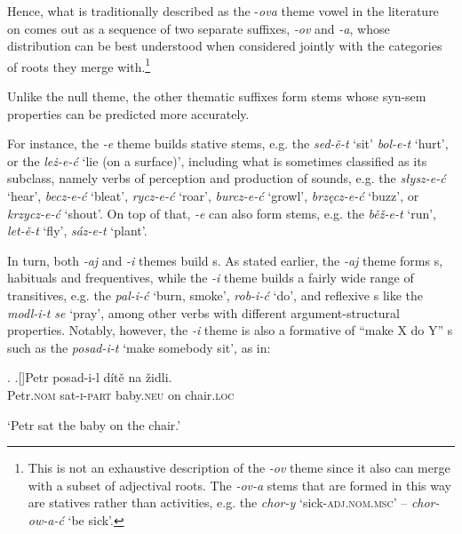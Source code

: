 Hence, what is traditionally described as the -\textit{ova} theme vowel in the literature on  comes out as a sequence of two separate suffixes, \textit{-ov} and \textit{-a}, whose distribution can be best understood when considered jointly with the categories of roots they merge with.\footnote{This is not an exhaustive description of the \textit{-ov} theme since it also can merge with a subset of adjectival roots. The \textit{-ov-a}  stems that are formed in this way are statives rather than activities, e.g. the  \textit{chor-y} `sick-\textsc{adj.nom.msc}' -- \textit{chor-ow-a-\'c} `be sick'.
} %
\par 
Unlike the null theme, the other thematic suffixes form  stems whose syn-sem properties can be predicted more accurately. 
\par
 For instance, the \textit{-e} theme builds stative stems, e.g. the  \textit{sed-\v{e}-t} `sit' \textit{bol-e-t} `hurt', or the  \textit{le\.z-e-\'c} `lie (on a surface)', including what is sometimes classified as its subclass, namely verbs of perception and production of sounds, e.g. the  \textit{s\l ysz-e-\'c} `hear', \textit{becz-e-\'c} `bleat', \textit{rycz-e-\'c} `roar', \textit{burcz-e-\'c} `growl', \textit{brz\k{e}cz-e-\'c} `buzz', or \textit{krzycz-e-\'c} `shout'. 
On top of that, \textit{-e} can also form  stems, e.g. the  \textit{b\v{e}\v{z}-e-t} `run', \textit{let-\v{e}-t} `fly', \textit{s\'az-e-t} `plant'.
\par 
In turn, both \textit{-aj} and \textit{-i} themes build  s.  As stated earlier, the \textit{-aj} theme forms s, habituals and frequentives, while the \textit{-i} theme builds a fairly wide range of transitives, e.g. the  \textit{pal-i-\'c} `burn, smoke', \textit{rob-i-\'c} `do', and reflexive s like the  \textit{modl-i-t se} `pray', among other  verbs with different argument-structural  properties. Notably, however, the \textit{-i} theme is also a formative of ``make X do Y'' s such as the  \textit{posad-i-t} `make somebody sit', as in:

\ex. 
\ag.[]\hspace{-22pt}Petr posad-i-l d\'it\v{e} na \v{z}idli.\\
\hspace{-22pt}Petr.\textsc{nom} sat-\textsc{i-part} baby.\textsc{neu} on chair\textsc{.loc}\\
\hspace{-22pt}\strut `Petr sat the baby on the chair.'

